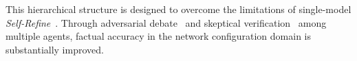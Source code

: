 This hierarchical structure is designed to overcome the limitations of single-model \textit{Self-Refine}~\cite{madaan2023selfrefine}.
Through adversarial debate~\cite{du2024improving} and skeptical verification~\cite{liang2024encouraging} among multiple agents, factual accuracy in the network configuration domain is substantially improved.




